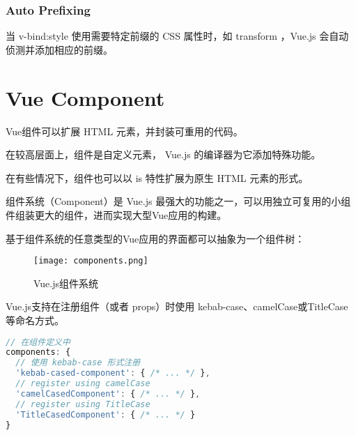 \subsection{Auto Prefixing}

当 v-bind:style 使用需要特定前缀的 CSS 属性时，如 transform ，Vue.js 会自动侦测并添加相应的前缀。




\chapter{Vue Component}



Vue组件可以扩展 HTML 元素，并封装可重用的代码。

\begin{compactitem}
\item 在较高层面上，组件是自定义元素， Vue.js 的编译器为它添加特殊功能。
\item 在有些情况下，组件也可以以 is 特性扩展为原生 HTML 元素的形式。
\end{compactitem}


组件系统（Component）是 Vue.js 最强大的功能之一，可以用独立可复用的小组件组装更大的组件，进而实现大型Vue应用的构建。

基于组件系统的任意类型的Vue应用的界面都可以抽象为一个组件树：

\begin{figure}[htbp]
\centering
\texttt{[image: components.png]}
\caption{Vue.js组件系统}
\end{figure}


Vue.js支持在注册组件（或者 props）时使用 kebab-case、camelCase或TitleCase等命名方式。




\begin{lstlisting}[language=JavaScript]
// 在组件定义中
components: {
  // 使用 kebab-case 形式注册
  'kebab-cased-component': { /* ... */ },
  // register using camelCase
  'camelCasedComponent': { /* ... */ },
  // register using TitleCase
  'TitleCasedComponent': { /* ... */ }
}
\end{lstlisting}

